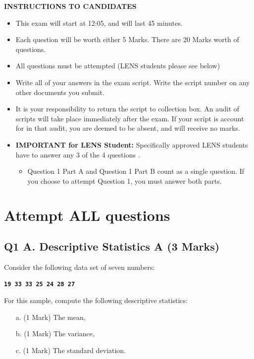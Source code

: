 \documentclass[a4paper,12pt]{article}
\begin{document}
	\begin{center}
		{\bf INSTRUCTIONS TO CANDIDATES}
	\end{center}
\begin{itemize} 
	\item This exam will start at 12:05, and will last 45 minutes.
	
	\item Each question will be worth either 5 Marks. There are 20 Marks worth of questions.
	\item All questions must be attempted (LENS students please see below)
	
	\item Write all of your answers in the exam script. Write the script number on any other documents you submit.
	
	\item It is your responsibility to return the script to collection box. An audit of scripts will take place immediately after the exam. If your script is account for in that audit,  you are deemed to be absent, and will receive no marks.
	
	\item \textbf{IMPORTANT for LENS Student:}
	Specifically approved LENS students have to answer any 3 of the 4 questions .
	\begin{itemize}
		\item Question 1 Part A and Question 1 Part B count as a single question. If you choose to attempt Question 1, you must answer both parts.
	\end{itemize}
	
	
\end{itemize}

	\newpage
\section*{Attempt ALL questions}


\subsection*{Q1 A. Descriptive Statistics A (3 Marks)} %
Consider the following data set of seven numbers:

\begin{center}
	\textbf{\texttt{19 33 33 25 24 28 27}}
\end{center}

\noindent For this sample, compute the following descriptive statistics:
\begin{itemize}
	\item[a.] (1 Mark) The mean,
	\item[b.] (1 Mark) The variance,
	\item[c.] (1 Mark) The standard deviation.
\end{itemize}
\end{document}
